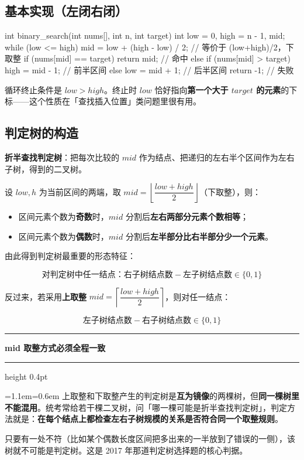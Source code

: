 \documentclass[11pt,openany,UTF8]{ctexbook}
\newcommand{\callouthead}[2]{%
  \par\addvspace{7pt}\noindent
  {\color{#1}\rule[-0.15em]{3pt}{1.05em}}\hspace{0.5em}%
  {\bfseries\color{#1}#2}\par\nobreak\vspace{-0.35em}%
  {\color{rulesep}\hrule height 0.4pt}\nobreak\vspace{0.45em}%
  \begingroup\small\setlength{\parindent}{0pt}%
  \leftskip=1.1em\rightskip=0.6em\noindent\ignorespaces}
\newcommand{\calloutend}{\par\endgroup\addvspace{7pt}}
\newenvironment{callwarn}[1]{\callouthead{warnbar}{#1}}{\calloutend}
\begin{document}
\subsection{基本实现（左闭右闭）}

\begin{codebox}
int binary_search(int nums[], int n, int target) {
    int low = 0, high = n - 1, mid;
    while (low <= high) {
        mid = low + (high - low) / 2;   // 等价于 (low+high)/2，下取整
        if (nums[mid] == target) return mid;      // 命中
        else if (nums[mid] > target) high = mid - 1;  // 前半区间
        else low = mid + 1;                        // 后半区间
    }
    return -1;   // 失败
}
\end{codebox}

循环终止条件是 $low>high$。终止时 $low$ 恰好指向\textbf{第一个大于 $target$ 的元素}的下标——这个性质在「查找插入位置」类问题里很有用。

\subsection{判定树的构造}

\textbf{折半查找判定树}：把每次比较的 $mid$ 作为结点、把递归的左右半个区间作为左右子树，得到的二叉树。

设 $low,h$ 为当前区间的两端，取 $mid=\left\lfloor\dfrac{low+high}{2}\right\rfloor$（下取整），则：

\begin{itemize}
\item 区间元素个数为\textbf{奇数}时，$mid$ 分割后\textbf{左右两部分元素个数相等}；
\item 区间元素个数为\textbf{偶数}时，$mid$ 分割后\textbf{左半部分比右半部分少一个元素}。
\end{itemize}
由此得到判定树最重要的形态特征：

\[\text{对判定树中任一结点：右子树结点数}-\text{左子树结点数}\in\{0,1\}\]

反过来，若采用\textbf{上取整} $mid=\left\lceil\dfrac{low+high}{2}\right\rceil$，则对任一结点：

\[\text{左子树结点数}-\text{右子树结点数}\in\{0,1\}\]

\begin{callwarn}{mid 取整方式必须全程一致}
上取整和下取整产生的判定树是\textbf{互为镜像}的两棵树，但\textbf{同一棵树里不能混用}。统考常给若干棵二叉树，问「哪一棵可能是折半查找判定树」，判定方法就是：\textbf{在每个结点上都检查左右子树规模的关系是否符合同一个取整规则}。

只要有一处不符（比如某个偶数长度区间把多出来的一半放到了错误的一侧），该树就不可能是判定树。这是 2017 年那道判定树选择题的核心判据。

\end{callwarn}
\end{document}

